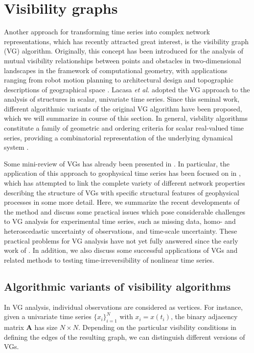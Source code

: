 \section{Visibility graphs}\label{sec:VisibilityGt}
	
	Another approach for transforming time series into complex network representations, which has recently attracted great interest, is the visibility graph (VG) algorithm. Originally, this concept has been introduced for the analysis of mutual visibility relationships between points and obstacles in two-dimensional landscapes in the framework of computational geometry, with applications ranging from robot motion planning to architectural design and topographic descriptions of geographical space \cite{Lozano1979,Nagy1994,Floriani1994,Turner2001}. Lacasa \emph{et al.}\cite{Lacasa2008} adopted the VG approach to the analysis of structures in scalar, univariate time series. Since this seminal work, different algorithmic variants of the original VG algorithm have been proposed, which we will summarize in course of this section. In general, visbility algorithms constitute a family of geometric and ordering criteria for scalar real-valued time series, providing a combinatorial representation of the underlying dynamical system \cite{Lacasa2018}.
	
	Some mini-review of VGs has already been presented in \cite{Nunez2012,Luque2016}. In particular, the application of this approach to geophysical time series has been focused on in \cite{Donner2012}, which has attempted to link the complete variety of different network properties describing the structure of VGs with specific structural features of geophysical processes in some more detail. Here, we summarize the recent developments of the method and discuss some practical issues which pose considerable challenges to VG analysis for experimental time series, such as missing data, homo- and heteroscedastic uncertainty of observations, and time-scale uncertainty. These practical problems for VG analysis have not yet fully answered since the early work of \cite{Donner2012}. In addition, we also discuss some successful applications of VGs and related methods to testing time-irreversibility of nonlinear time series. 
	
	\subsection{Algorithmic variants of visibility algorithms}
	In VG analysis, individual observations are considered as vertices. For instance, given a univariate time series $\{x_i \}_{i=1}^{N}$ with $x_i = x(t_i)$, the binary adjacency matrix $\mathbf{A}$ has size ${N \times N}$. Depending on the particular visibility conditions in defining the edges of the resulting graph, we can distinguish different versions of VGs. 
	
